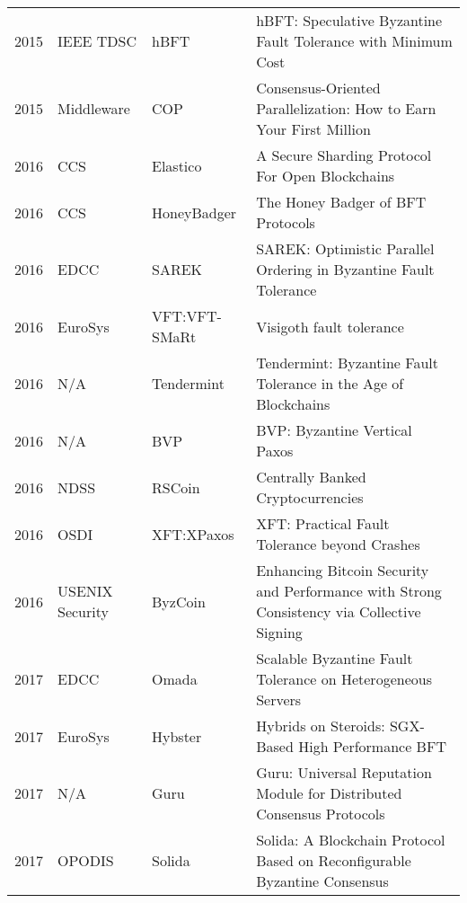 \documentclass{article}
\begin{document}
\begin{landscape}
\begin{table}[]
{\begin{tabular}{llll}
2015 & IEEE TDSC         & hBFT           & hBFT: Speculative Byzantine Fault Tolerance with Minimum Cost                             \\
2015 & Middleware        & COP            & Consensus-Oriented Parallelization: How to Earn Your First Million                        \\
2016 & CCS               & Elastico       & A Secure Sharding Protocol For Open Blockchains                                           \\
2016 & CCS               & HoneyBadger    & The Honey Badger of BFT Protocols                                                         \\
2016 & EDCC              & SAREK          & SAREK: Optimistic Parallel Ordering in Byzantine Fault Tolerance                          \\
2016 & EuroSys           & VFT:VFT-SMaRt  & Visigoth fault tolerance                                                                  \\
2016 & N/A               & Tendermint     & Tendermint: Byzantine Fault Tolerance in the Age of Blockchains                           \\
2016 & N/A               & BVP            & BVP: Byzantine Vertical Paxos                                                             \\
2016 & NDSS              & RSCoin         & Centrally Banked Cryptocurrencies                                                         \\
2016 & OSDI              & XFT:XPaxos     & XFT: Practical Fault Tolerance beyond Crashes                                             \\
2016 & USENIX Security   & ByzCoin        & Enhancing Bitcoin Security and Performance with Strong Consistency via Collective Signing \\
2017 & EDCC              & Omada          & Scalable Byzantine Fault Tolerance on Heterogeneous Servers                               \\
2017 & EuroSys           & Hybster        & Hybrids on Steroids: SGX-Based High Performance BFT                                       \\
2017 & N/A               & Guru           & Guru: Universal Reputation Module for Distributed Consensus Protocols                     \\
2017 & OPODIS            & Solida         & Solida: A Blockchain Protocol Based on Reconfigurable Byzantine Consensus                 \\

\end{tabular}}
\end{table}
\end{landscape}
\end{document}

